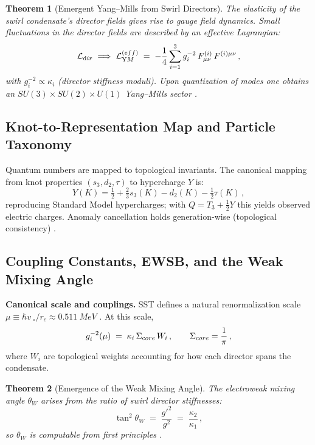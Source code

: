 \documentclass[11pt]{article}
\newtheorem{theorem}{Theorem}[section]
\begin{document}
	\begin{theorem}[Emergent Yang--Mills from Swirl Directors]
		The elasticity of the swirl condensate’s director fields gives rise to gauge field dynamics. Small fluctuations in the director fields are described by an effective Lagrangian:
		\[
			\mathcal{L}_{\textrm dir} \;\Longrightarrow\; \mathcal{L}_{\textrm YM}^{\textrm (eff)} \;=\; -\frac{1}{4}\sum_{i=1}^{3} g_i^{-2}\, F_{\mu\nu}^{(i)}\,F^{(i)\mu\nu}\,,
		\]
		with $g_i^{-2} \propto \kappa_i$ (director stiffness moduli). Upon quantization of modes one obtains an $SU(3)\times SU(2)\times U(1)$ Yang--Mills sector \cite{ChoFaddeevNiemi1999,Iskandarani2025Canon034}.
	\end{theorem}

	\subsection{Knot-to-Representation Map and Particle Taxonomy}
	Quantum numbers are mapped to topological invariants. The canonical mapping from knot properties $(s_3, d_2, \tau)$ to hypercharge $Y$ is:
	\[
		Y(K)=\tfrac{1}{2}+\tfrac{2}{3}s_3(K)-d_2(K)-\tfrac{1}{2}\tau(K)\,,
	\]
	reproducing Standard Model hypercharges; with $Q = T_3 + \tfrac{1}{2}Y$ this yields observed electric charges. Anomaly cancellation holds generation-wise (topological consistency) \cite{Weinberg1967,PeskinSchroeder1995,Iskandarani2025Canon034}.

	\subsection{Coupling Constants, EWSB, and the Weak Mixing Angle}
	\textbf{Canonical scale and couplings.} SST defines a natural renormalization scale $\mu \equiv \hbar v_{\!\!\;\circ}/r_c \approx \SI{0.511}{MeV}$ \cite{Iskandarani2025Canon034}. At this scale,
	\[
		g_i^{-2}(\mu) \;=\; \kappa_i\,\Sigma_{\textrm core}\,W_i\,,\qquad \Sigma_{\textrm core}=\frac{1}{\pi}\,,
	\]
	where $W_i$ are topological weights accounting for how each director spans the condensate.

	\begin{theorem}[Emergence of the Weak Mixing Angle]
		The electroweak mixing angle $\theta_W$ arises from the ratio of swirl director stiffnesses:
		\[
			\tan^2\theta_W \;=\; \frac{g'^2}{g^2} \;=\; \frac{\kappa_2}{\kappa_1}\,,
		\]
		so $\theta_W$ is computable from first principles \cite{Weinberg1967,PeskinSchroeder1995,Iskandarani2025Canon034}.
	\end{theorem}
\end{document}
